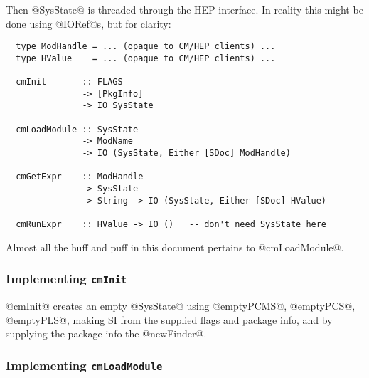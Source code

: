 \documentclass[11pt]{article}
\begin{document}
Then @SysState@ is threaded through the HEP interface.  In reality
this might be done using @IORef@s, but for clarity:
\begin{verbatim}
  type ModHandle = ... (opaque to CM/HEP clients) ...
  type HValue    = ... (opaque to CM/HEP clients) ...

  cmInit       :: FLAGS 
               -> [PkgInfo]
               -> IO SysState

  cmLoadModule :: SysState 
               -> ModName 
               -> IO (SysState, Either [SDoc] ModHandle)

  cmGetExpr    :: ModHandle 
               -> SysState 
               -> String -> IO (SysState, Either [SDoc] HValue)

  cmRunExpr    :: HValue -> IO ()   -- don't need SysState here
\end{verbatim}
Almost all the huff and puff in this document pertains to @cmLoadModule@.


\subsubsection{Implementing \mbox{\tt cmInit}}
@cmInit@ creates an empty @SysState@ using @emptyPCMS@, @emptyPCS@,
@emptyPLS@, making SI from the supplied flags and package info, and 
by supplying the package info the @newFinder@.


\subsubsection{Implementing \mbox{\tt cmLoadModule}}
\end{document}
